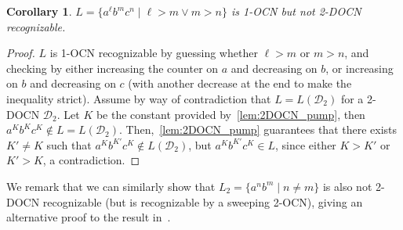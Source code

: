 \documentclass[11pt,a4paper]{amsart}
\newtheorem{corollary}[theorem]{Corollary}
\theoremstyle{definition}
\newcommand{\shtodo}[1]{\todo[color=cyan!25,size=\small]{SH: #1}}
\newcommand{\cD}{\mathcal{D}}
\begin{document}
\begin{corollary}
\label{thm:not_2DOCN_recognizable}
	$L=\{a^\ell b^mc^n \mid \ell > m \lor m > n\}$ is 1-OCN but not 2-DOCN recognizable.
\end{corollary}
\begin{proof}

$L$ is 1-OCN recognizable by guessing whether $\ell>m$ or $m>n$, and checking
by either increasing the counter on $a$ and decreasing on $b$, or increasing
on $b$ and decreasing on $c$ (with another decrease at the end to make the
inequality strict).  Assume by way of contradiction that $L=L(\cD_2)$ for a
2-DOCN $\cD_2$. Let $K$ be the constant provided by~\cref{lem:2DOCN_pump},
then $a^{K}b^Kc^K\notin L=L(\cD_2)$. Then,~\cref{lem:2DOCN_pump} guarantees that
there exists $K'\neq K$ such that $a^{K}b^{K'}c^K\notin L(\cD_2)$, but
$a^{K}b^{K'}c^K\in L$, since either $K>K'$ or $K'>K$, a contradiction.
\end{proof} 
We remark that we can similarly show that $L_2=\{a^nb^m \mid n \neq m\}$ is also not
2-DOCN recognizable (but is recognizable by a sweeping 2-OCN), giving an
alternative proof to the result in~\cite{miyano1982two}.

\end{document}

